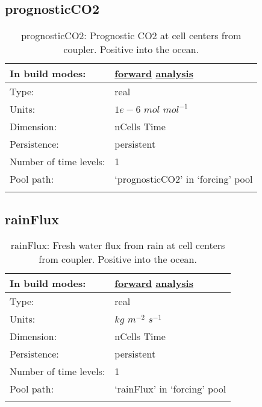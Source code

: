 \subsection[prognosticCO2]{prognosticCO2}
\label{subsec:var_sec_forcing_prognosticCO2}
\begin{center}
\begin{longtable}{| p{2.0in} | p{4.0in} |}
        \hline 
        In build modes: & \hyperref[subsec:forward_var_tab_forcing]{forward} \hyperref[subsec:analysis_var_tab_forcing]{analysis} \\
        \hline 
        Type: & real \\
        \hline 
        Units: & $1e-6$ $mol$ $mol^{-1}$ \\
        \hline 
        Dimension: & nCells Time \\
        \hline 
        Persistence: & persistent \\
        \hline 
        Number of time levels: & 1 \\
        \hline 
            Pool path: & `prognosticCO2' in `forcing' pool \\
		 \hline 
    \caption{prognosticCO2: Prognostic CO2 at cell centers from coupler. Positive into the ocean.}
\end{longtable}
\end{center}
\subsection[rainFlux]{rainFlux}
\label{subsec:var_sec_forcing_rainFlux}
\begin{center}
\begin{longtable}{| p{2.0in} | p{4.0in} |}
        \hline 
        In build modes: & \hyperref[subsec:forward_var_tab_forcing]{forward} \hyperref[subsec:analysis_var_tab_forcing]{analysis} \\
        \hline 
        Type: & real \\
        \hline 
        Units: & $kg$ $m^{-2}$ $s^{-1}$ \\
        \hline 
        Dimension: & nCells Time \\
        \hline 
        Persistence: & persistent \\
        \hline 
        Number of time levels: & 1 \\
        \hline 
            Pool path: & `rainFlux' in `forcing' pool \\
		 \hline 
    \caption{rainFlux: Fresh water flux from rain at cell centers from coupler. Positive into the ocean.}
\end{longtable}
\end{center}
